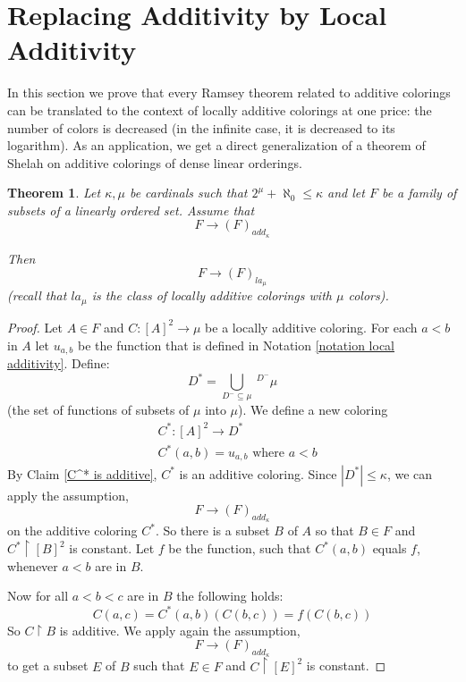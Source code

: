 \documentclass[11pt]{amsart}
\theoremstyle{plain}
\newtheorem{theorem}{Theorem}[section]
\theoremstyle{definition} %
\theoremstyle{remark}
\begin{document}
\section{Replacing Additivity by Local Additivity}
In this section we prove that every Ramsey theorem related to additive colorings can be translated to the context of locally additive colorings at one price: the number of colors is decreased (in the infinite case, it is decreased to its logarithm). As an application, we get a direct generalization of a theorem  of Shelah on additive colorings of dense linear orderings.








\begin{theorem}\label{generalizing add to loc less than mu colors}\label{theorem generalizing add to la}
Let $\kappa,\mu$ be cardinals such that $2^\mu+\aleph_0 \leq \kappa$ and let $F$ be a family of subsets of a linearly ordered set.
Assume that
\[
F \rightarrow (F)_{add_\kappa}
\]

Then
\[
F \rightarrow (F)_{la_\mu}
\]
(recall that $la_\mu$ is the class of locally additive colorings with $\mu$ colors).
\end{theorem}

\begin{proof}
Let $A \in F$ and $C:[A]^2 \to \mu$ be a locally additive coloring. For each $a<b$ in $A$ let $u_{a,b}$ be the function that is defined in Notation \ref{notation local additivity}.
Define:
\[
D^*=\bigcup_{D^- \subseteq \mu} \ ^{D^-} \mu
\]
(the set of functions of subsets of $\mu$ into $\mu$).  We define a new coloring
\begin{align*}
&C^*:[A]^2 \to D^* \\
&C^*(a,b)=u_{a,b} \text{ where } a<b
\end{align*}
By Claim \ref{C^* is additive}, $C^*$ is an additive coloring. Since $|D^*| \leq \kappa$, we can apply the assumption,
\[
F \rightarrow (F)_{add_\kappa}
\]
on the additive coloring $C^*$. So there is a subset $B$ of $A$ so that
$B \in F$ and $C^* \restriction [B]^2$ is constant. Let $f$ be the function, such that $C^*(a,b)$ equals $f$, whenever $a<b$ are in $B$.

Now for all $a<b<c$ are in $B$ the following holds:
\[
C(a,c)=C^*(a,b)(C(b,c))=f(C(b,c))
\]
So $C \restriction B$ is additive. We apply again the assumption,
\[
F \rightarrow (F)_{add_\kappa}
\]
to get a subset $E$ of $B$ such that
$E \in F$
and $C \restriction [E]^2$ is constant.
\end{proof}
\end{document}
